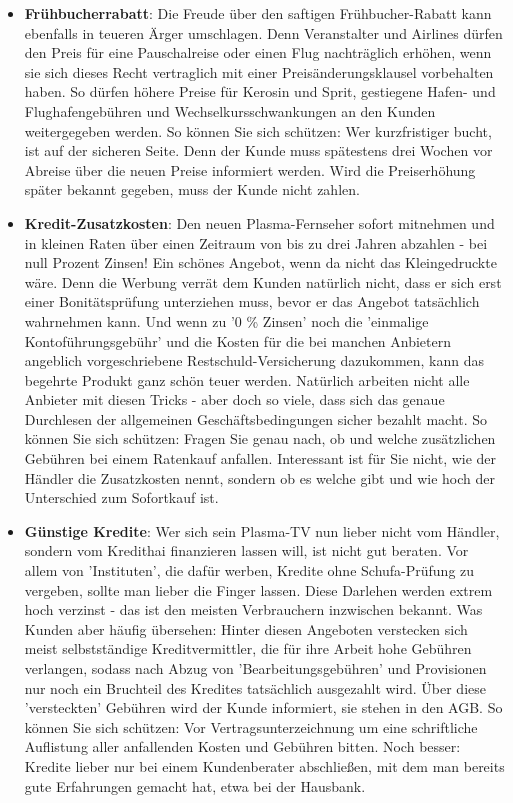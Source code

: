 \documentclass[a4paper]{article}
\begin{document}
\begin{itemize}
\item \textbf{Frühbucherrabatt}: Die Freude über den saftigen Frühbucher-Rabatt kann ebenfalls in teueren Ärger umschlagen. Denn Veranstalter und Airlines dürfen den Preis für eine Pauschalreise oder einen Flug nachträglich erhöhen, wenn sie sich dieses Recht vertraglich mit einer Preisänderungsklausel vorbehalten haben. So dürfen höhere Preise für Kerosin und Sprit, gestiegene Hafen- und Flughafengebühren und Wechselkursschwankungen an den Kunden weitergegeben werden. So können Sie sich schützen: Wer kurzfristiger bucht, ist auf der sicheren Seite. Denn der Kunde muss spätestens drei Wochen vor Abreise über die neuen Preise informiert werden. Wird die Preiserhöhung später bekannt gegeben, muss der Kunde nicht zahlen.

\item \textbf{Kredit-Zusatzkosten}: Den neuen Plasma-Fernseher sofort mitnehmen und in kleinen Raten über einen Zeitraum von bis zu drei Jahren abzahlen - bei null Prozent Zinsen! Ein schönes Angebot, wenn da nicht das Kleingedruckte wäre. Denn die Werbung verrät dem Kunden natürlich nicht, dass er sich erst einer Bonitätsprüfung unterziehen muss, bevor er das Angebot tatsächlich wahrnehmen kann. Und wenn zu '0 \% Zinsen' noch die 'einmalige Kontoführungsgebühr' und die Kosten für die bei manchen Anbietern angeblich vorgeschriebene Restschuld-Versicherung dazukommen, kann das begehrte Produkt ganz schön teuer werden. Natürlich arbeiten nicht alle Anbieter mit diesen Tricks - aber doch so viele, dass sich das genaue Durchlesen der allgemeinen Geschäftsbedingungen sicher bezahlt macht. So können Sie sich schützen: Fragen Sie genau nach, ob und welche zusätzlichen Gebühren bei einem Ratenkauf anfallen. Interessant ist für Sie nicht, wie der Händler die Zusatzkosten nennt, sondern ob es welche gibt und wie hoch der Unterschied zum Sofortkauf ist.

\item \textbf{Günstige Kredite}: Wer sich sein Plasma-TV nun lieber nicht vom Händler, sondern vom Kredithai finanzieren lassen will, ist nicht gut beraten. Vor allem von 'Instituten', die dafür werben, Kredite ohne Schufa-Prüfung zu vergeben, sollte man lieber die Finger lassen. Diese Darlehen werden extrem hoch verzinst - das ist den meisten Verbrauchern inzwischen bekannt. Was Kunden aber häufig übersehen: Hinter diesen Angeboten verstecken sich meist selbstständige Kreditvermittler, die für ihre Arbeit hohe Gebühren verlangen, sodass nach Abzug von 'Bearbeitungsgebühren' und Provisionen nur noch ein Bruchteil des Kredites tatsächlich ausgezahlt wird. Über diese 'versteckten' Gebühren wird der Kunde informiert, sie stehen in den AGB. So können Sie sich schützen: Vor Vertragsunterzeichnung um eine schriftliche Auflistung aller anfallenden Kosten und Gebühren bitten. Noch besser: Kredite lieber nur bei einem Kundenberater abschließen, mit dem man bereits gute Erfahrungen gemacht hat, etwa bei der Hausbank.


\end{itemize}
\end{document}
